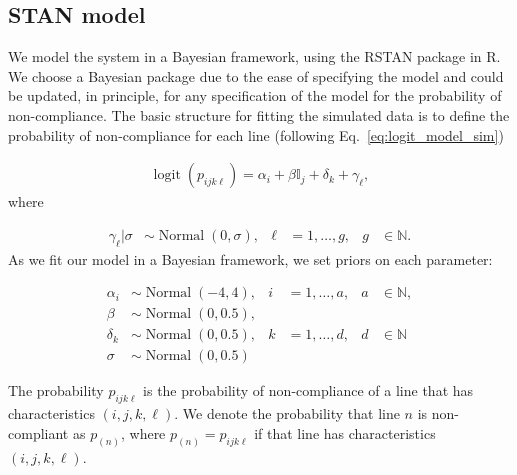 \documentclass{article}
\DeclareMathOperator{\logit}{logit}
\DeclareMathOperator{\Normal}{Normal}
\begin{document}
\subsection{STAN model}
We model the system in a Bayesian framework, using the RSTAN package in R. We choose a Bayesian package due to the ease of specifying the model and could be updated, in principle, for any specification of the model for the probability of non-compliance. The basic structure for fitting the simulated data is to define the probability of non-compliance for each line (following Eq.~\eqref{eq:logit_model_sim})

\begin{align}
\logit(p_{ijk\ell}) = \alpha_{i} + \beta\mathbb{I}_j + \delta_k + \gamma_\ell, \label{eq:logit_model_fit_sim}
\end{align}
where 

\begin{align}
\gamma_\ell | \sigma &\sim \Normal(0, \sigma), & \ell &= 1,\ldots, g, & g&\in \mathbb{N}.
\end{align}
As we fit our model in a Bayesian framework, we set priors on each parameter:

\begin{align}
\alpha_i &\sim \Normal(-4, 4), & i&=1, \ldots, a, & a&\in \mathbb{N},\\
\beta &\sim \Normal(0, 0.5),\\
\delta_k &\sim \Normal(0, 0.5), & k &= 1,\ldots, d, & d &\in \mathbb{N}\\
\sigma &\sim \Normal(0, 0.5)
\end{align}

The probability $p_{ijk\ell}$ is the probability of non-compliance of a line that has characteristics $(i,j,k,\ell)$. We denote the probability that line $n$ is non-compliant as $p_{(n)}$, where $p_{(n)} = p_{ijk\ell}$ if that line has characteristics $(i,j,k,\ell)$.
\end{document}

